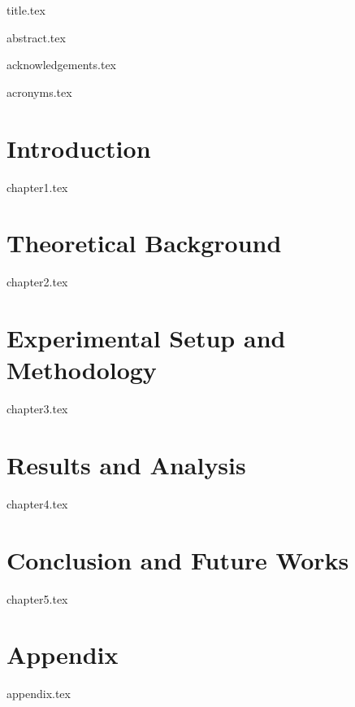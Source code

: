 \documentclass[9pt]{report}
\begin{document}
 

{title.tex}

{abstract.tex}
\newpage

{acknowledgements.tex}
\newpage

\tableofcontents
\newpage

{acronyms.tex}
\newpage

\pagestyle{headings} 

\chapter{Introduction}
{chapter1.tex}

\chapter{Theoretical Background}
{chapter2.tex}

\chapter{Experimental Setup and Methodology}
{chapter3.tex}

\chapter{Results and Analysis}
{chapter4.tex}

\chapter{Conclusion and Future Works}
{chapter5.tex}


\appendix
\chapter*{Appendix} 
{appendix.tex}



\end{document}
